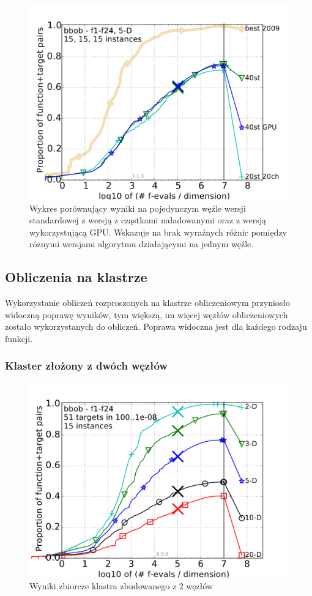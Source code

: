 \documentclass[12pt, twoside, openany, abstract=on]{report}
\theoremstyle{definition}
\begin{document}

\begin{figure}[H]
    \includegraphics[scale=.75]{charts/1nodeCompare_5D.pdf} \par
 \caption{Wykres porównujący wyniki na pojedynczym węźle wersji standardowej z wersją z cząstkami naładowanymi oraz z wersją wykorzystującą GPU. Wskazuje na brak wyraźnych różnic pomiędzy różnymi wersjami algorytmu działającymi na jednym węźle.}
\end{figure}

\subsection{Obliczenia na klastrze}
Wykorzystanie obliczeń rozproszonych na klastrze obliczeniowym przyniosło widoczną poprawę wyników, tym większą, im więcej węzłów obliczeniowych zostało wykorzystanych do obliczeń. Poprawa widoczna jest dla każdego rodzaju funkcji.

\subsubsection{Klaster złożony z dwóch węzłów}

\begin{figure}[H]
    \includegraphics[scale=.75]{charts/2nodes.pdf} 
 \caption{Wyniki zbiorcze klastra zbudowanego z 2 węzłów}
\end{figure}
\end{document}
